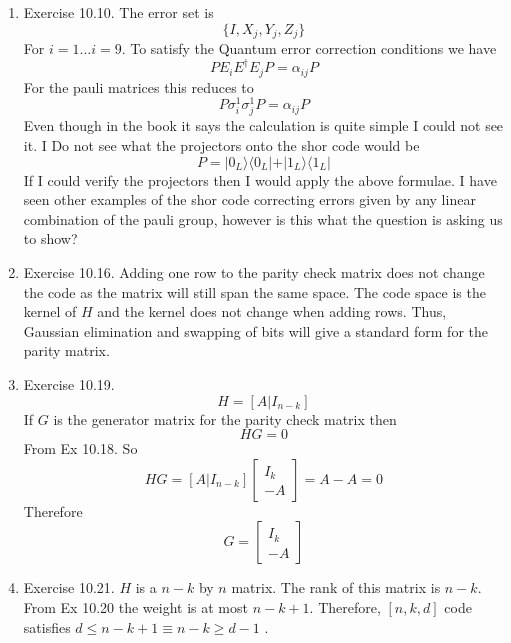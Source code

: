 \documentclass[12pt]{article}
\newcommand{\ket}[1]{\vert{#1}\rangle}
\newcommand{\bra}[1]{\langle{#1}\vert}
\begin{document}
\begin{enumerate}
    \item Exercise 10.10. The error set is 
    $$ \{ I, X_j, Y_j, Z_j \} $$
    For $i=1 \ldots i=9$. To satisfy the Quantum error correction conditions we have 
    $$ P E_i E^{\dagger} E_j P = \alpha_{ij} P $$
    For the pauli matrices this reduces to 
    $$ P \sigma^1_i \sigma_j^1 P = \alpha_{ij} P $$
    Even though in the book it says the calculation is quite simple I could not see it. I Do not see what the projectors onto the shor code would be
    $$ P = \ket{0_L} \bra{0_L} + \ket{1_L} \bra{1_L} $$
    If I could verify the projectors then I would apply the above formulae. I have seen other examples of the shor code correcting errors given by any linear combination of the pauli group, however is this what the question is asking us to show? 

    
    \item Exercise 10.16. Adding one row to the parity check matrix does not change the code as the matrix will still span the same space. The code space is the kernel of $H$ and the kernel does not change when adding rows. Thus, Gaussian elimination and swapping of bits will give a standard form for the parity matrix. 
    
    \item Exercise 10.19. 
    $$ H = [A|I_{n-k}] $$
    If $G$ is the generator matrix for the parity check matrix then 
    $$ H G = 0 $$
    From Ex 10.18. So 
    $$ HG = [A|I_{n-k}] \begin{bmatrix}
        I_k \\ \hline -A 
    \end{bmatrix} = A-A = 0 $$
    Therefore 
    $$ G = \begin{bmatrix}
        I_k \\ \hline -A 
    \end{bmatrix} $$

    \item Exercise 10.21. $H$ is a $n-k$ by $n$ matrix. The rank of this matrix is $n-k$. From Ex 10.20 the weight is at most $n-k +1$. Therefore, $[n,k,d]$ code satisfies $d \leq n-k +1 \equiv n-k \geq d -1$ .
    

\end{enumerate}
\end{document}
